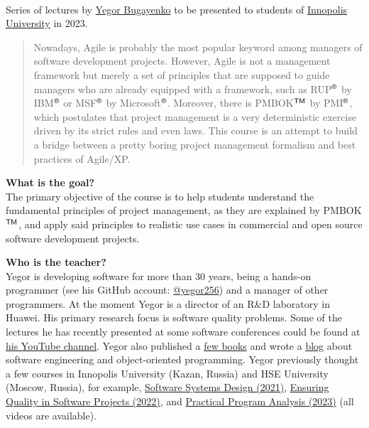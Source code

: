 \documentclass[nobrand,anonymous,nodate,nosecurity]{huawei}
\newcommand\REG{$^{\tiny{\textsf{\textregistered}}}$}
\newcommand\TM{$^{\tiny{\textsf{TM}}}$}
\begin{document}
{\\
Series of lectures by \href{https://www.yegor256.com}{Yegor Bugayenko} to be presented
to students of \href{https://innopolis.university/en/}{Innopolis University} in 2023.


\begin{abstract}
Nowadays, Agile is probably the most popular keyword among managers of software development projects.
However, Agile is not a management framework but merely a set of principles that are supposed to guide
managers who are already equipped with a framework, such as
RUP\REG{} by IBM\REG{} or MSF\REG{} by Microsoft\REG{}.
Moreover, there is PMBOK\TM{} by PMI\REG{}, which postulates that project management is a very deterministic
exercise driven by its strict rules and even laws.
This course is an attempt to build a bridge between
a pretty boring project management formalism
and
best practices of Agile/XP.
\end{abstract}


\textbf{What is the goal?}\\
The primary objective of the course is to help students understand the fundamental
principles of project management, as they are explained by PMBOK\TM{}, and
apply said principles to realistic use cases in commercial and open source
 software development projects.

\textbf{Who is the teacher?}\\
Yegor is developing software for more than 30 years, being a hands-on programmer
(see his GitHub account: \href{https://github.com/yegor256}{@yegor256})
and a manager of other programmers. At the moment Yegor is a director
of an R\&D laboratory in Huawei. His primary research focus is
software quality problems. Some of the lectures he has recently presented
at some software conferences could be found at
\href{https://www.youtube.com/channel/UCr9qCdqXLm2SU0BIs6d_68Q}{his YouTube channel}.
Yegor also published a \href{https://www.yegor256.com/books.html}{few books}
and wrote a \href{https://www.yegor256.com/contents.html}{blog} about software engineering
and object-oriented programming.
Yegor previously thought a few courses in
Innopolis University (Kazan, Russia)
and HSE University (Moscow, Russia),
for example,
\href{https://github.com/yegor256/ssd16}{Software Systems Design (2021)},
\href{https://github.com/yegor256/eqsp}{Ensuring Quality in Software Projects (2022)},
and
\href{https://github.com/yegor256/ppa}{Practical Program Analysis (2023)}
(all videos are available).

}
\end{document}
